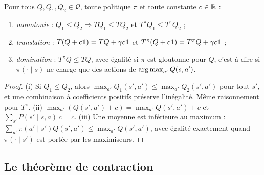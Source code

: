 \begin{lemme}\label{lem-proprietes}
Pour tous $Q,Q_1,Q_2\in\mathcal Q$, toute politique $\pi$ et toute constante $c\in\mathbb{R}$ :
\begin{enumerate}[label=(\roman*)]
\item \emph{monotonie} : $Q_1\le Q_2\Rightarrow TQ_1\le TQ_2$ et $T^\pi Q_1\le T^\pi Q_2$ ;
\item \emph{translation} : $T(Q+c\mathbf{1})=TQ+\gamma c\mathbf{1}$ et $T^\pi(Q+c\mathbf{1})=T^\pi Q+\gamma c\mathbf{1}$ ;
\item \emph{domination} : $T^\pi Q\le TQ$, avec égalité si $\pi$ est gloutonne pour $Q$, c'est-à-dire si $\pi(\cdot\mid s)$ ne charge que des actions de $\operatorname*{arg\,max}_{a'}Q(s,a')$.
\end{enumerate}
\end{lemme}
\begin{proof}
(i) Si $Q_1\le Q_2$, alors $\max_{a'}Q_1(s',a')\le\max_{a'}Q_2(s',a')$ pour tout $s'$, et une combinaison à coefficients positifs préserve l'inégalité. Même raisonnement pour $T^\pi$. (ii) $\max_{a'}(Q(s',a')+c)=\max_{a'}Q(s',a')+c$ et $\sum_{s'}P(s'\mid s,a)\,c=c$. (iii) Une moyenne est inférieure au maximum : $\sum_{a'}\pi(a'\mid s')Q(s',a')\le\max_{a'}Q(s',a')$, avec égalité exactement quand $\pi(\cdot\mid s')$ est portée par les maximiseurs.
\end{proof}

\subsection{Le théorème de contraction}

